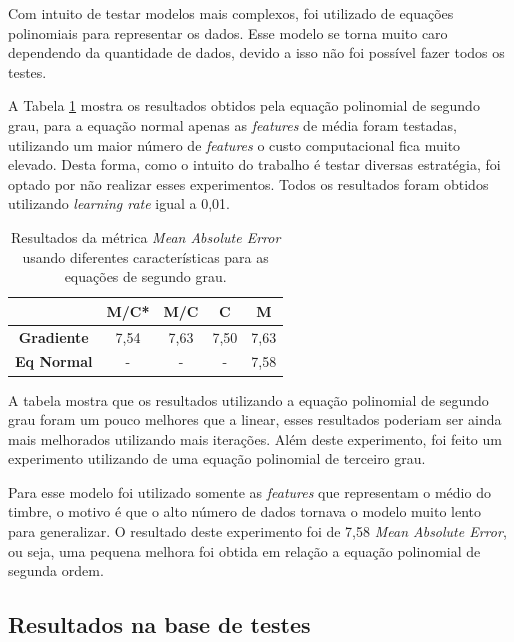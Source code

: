 \documentclass[conference]{IEEEtran}
\begin{document}
Com intuito de testar modelos mais complexos, foi utilizado de equações polinomiais para representar os dados. Esse modelo se torna muito caro dependendo da quantidade de dados, devido a isso não foi possível fazer todos os testes. 

A Tabela \ref{tab:comp} mostra os resultados obtidos pela equação polinomial de segundo grau, para a equação normal apenas as \emph{features} de média foram testadas, utilizando um maior número de \emph{features} o custo computacional fica muito elevado. Desta forma, como o intuito do trabalho é testar diversas estratégia, foi optado por não realizar esses experimentos. Todos os resultados foram obtidos utilizando \emph{learning rate} igual a 0,01.

\begin{table}[!h]
	\centering
	
	\begin{tabular}{ccccc} \\ \hline
		\backslashbox{\textbf{Modelos}}{\textbf{Features}} & \textbf{M/C*} & \textbf{M/C} & \textbf{C} & \textbf{M} \\ \hline
		\textbf{Gradiente}      & 7,54     & 7,63         & 7,50       & 7,63  \\  
		\textbf{Eq Normal}      & -       & -         & -       & 7,58    \\ \hline 
	\end{tabular}
	\caption{Resultados da métrica \textit{Mean Absolute Error} usando diferentes características para as equações de segundo grau.}
	\label{tab:comp}
\end{table}

A tabela mostra que os resultados utilizando a equação polinomial de segundo grau foram um pouco melhores que a linear, esses resultados poderiam ser ainda mais melhorados utilizando mais iterações. Além deste experimento, foi feito um experimento utilizando de uma equação polinomial de terceiro grau. 

Para esse modelo foi utilizado somente as \emph{features} que representam o médio do timbre, o motivo é que o alto número de dados tornava o modelo muito lento para generalizar. O resultado deste experimento foi de 7,58 \emph{Mean Absolute Error}, ou seja, uma pequena melhora foi obtida em relação a equação polinomial de segunda ordem.



\subsection{Resultados na base de testes }
\end{document}
